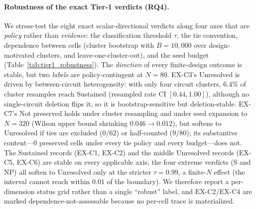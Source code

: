 \paragraph{Robustness of the exact Tier-1 verdicts (RQ4).}
We stress-test the eight exact scalar-directional verdicts along four axes that are
\emph{policy} rather than \emph{evidence}: the classification threshold $\tau$, the
tie convention, dependence between cells (cluster bootstrap with $B{=}10{,}000$ over
design-motivated clusters, and leave-one-cluster-out), and the seed budget
(Table~\ref{tab:tier1_robustness}). The \emph{direction} of every finite-design
outcome is stable, but two \emph{labels} are policy-contingent at $N{=}80$. EX-C3's
Unresolved is driven by between-circuit heterogeneity: with only four circuit
clusters, $6.4\%$ of cluster resamples reach Sustained (resampled rate CI
$[0.44,1.00]$), although no single-circuit deletion flips it, so it is
bootstrap-sensitive but deletion-stable. EX-C7's Not preserved holds under cluster
resampling and under seed expansion to $N{=}320$ (Wilson upper bound shrinking
$0.046\!\to\!0.012$), but softens to Unresolved if ties are excluded ($0/62$) or
half-counted ($9/80$); its substantive content---$0$ preserved cells under every tie
policy and every budget---does not. The Sustained records (EX-C1, EX-C2) and the
middle Unresolved records (EX-C5, EX-C6) are stable on every applicable axis; the
four extreme verdicts (S and NP) all soften to Unresolved only at the stricter
$\tau{=}0.99$, a finite-$N$ effect (the interval cannot reach within $0.01$ of the
boundary). We therefore report a per-dimension status grid rather than a single
``robust'' label, and EX-C2/EX-C4 are marked dependence-not-assessable because no
per-cell trace is materialized.

